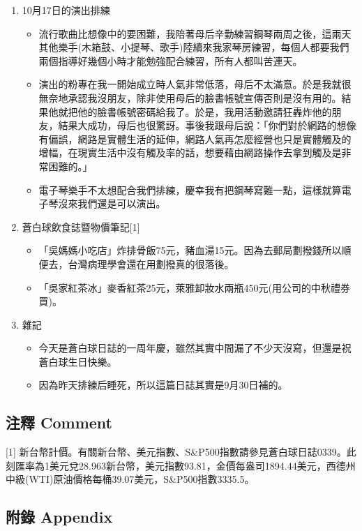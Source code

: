 \documentclass[
]{article}
\providecommand{\tightlist}{%
  \setlength{\itemsep}{0pt}\setlength{\parskip}{0pt}}
\begin{document}
\begin{enumerate}
\def\labelenumi{\arabic{enumi}.}
\item
  10月17日的演出排練

  \begin{itemize}
  \tightlist
  \item
    流行歌曲比想像中的要困難，我陪著母后辛勤練習鋼琴兩周之後，這兩天其他樂手(木箱鼓、小提琴、歌手)陸續來我家琴房練習，每個人都要我們兩個指導好幾個小時才能勉強配合練習，所有人都叫苦連天。
  \item
    演出的粉專在我一開始成立時人氣非常低落，母后不太滿意。於是我就很無奈地承認我沒朋友，除非使用母后的臉書帳號宣傳否則是沒有用的。結果他就把他的臉書帳號密碼給我了。於是，我用活動邀請狂轟炸他的朋友，結果大成功，母后也很驚訝。事後我跟母后說：「你們對於網路的想像有偏誤，網路是實體生活的延伸，網路人氣再怎麼經營也只是實體觸及的增幅，在現實生活中沒有觸及率的話，想要藉由網路操作去拿到觸及是非常困難的。」
  \item
    電子琴樂手不太想配合我們排練，慶幸我有把鋼琴寫難一點，這樣就算電子琴沒來我們還是可以演出。
  \end{itemize}
\item
  蒼白球飲食誌暨物價筆記{[}1{]}

  \begin{itemize}
  \tightlist
  \item
    「吳媽媽小吃店」炸排骨飯75元，豬血湯15元。因為去郵局劃撥錢所以順便去，台灣病理學會還在用劃撥真的很落後。
  \item
    「吳家紅茶冰」麥香紅茶25元，萊雅卸妝水兩瓶450元(用公司的中秋禮券買)。
  \end{itemize}
\item
  雜記

  \begin{itemize}
  \tightlist
  \item
    今天是蒼白球日誌的一周年慶，雖然其實中間漏了不少天沒寫，但還是祝蒼白球生日快樂。
  \item
    因為昨天排練后睡死，所以這篇日誌其實是9月30日補的。
  \end{itemize}
\end{enumerate}

\hypertarget{ux6ce8ux91cb-comment-27}{%
\subsection{注釋 Comment}\label{ux6ce8ux91cb-comment-27}}

{[}1{]}
新台幣計價。有關新台幣、美元指數、S\&P500指數請參見蒼白球日誌0339。此刻匯率為1美元兌28.963新台幣，美元指數93.81，金價每盎司1894.44美元，西德州中級(WTI)原油價格每桶39.07美元，S\&P500指數3335.5。

\hypertarget{ux9644ux9304-appendix-27}{%
\subsection{附錄 Appendix}\label{ux9644ux9304-appendix-27}}
\end{document}
